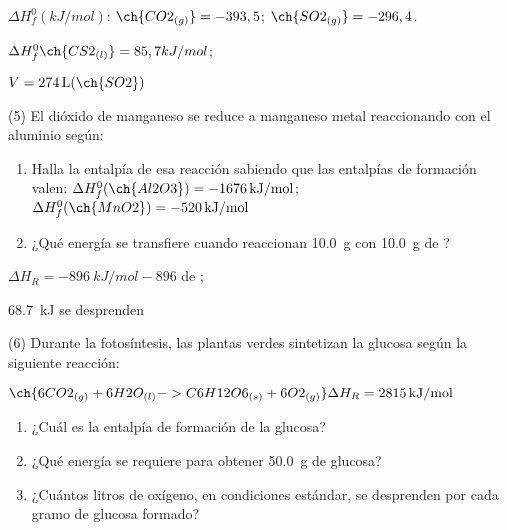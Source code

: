 \documentclass[10pt]{article}
\newenvironment{gexdatos}{
    \noindent\makebox[0pt][r]{\textit{Datos:}}
}{\vspace{5pt}}
\begin{document}
\begin{multicols}{2}
\begin{exercise}
  \begin{gexdatos}
    \( \Delta H^0_f (\si{kJ/mol}) \): \( \ch{CO2_{(g)}} = -393,5 \); \( \ch{SO2_{(g)}} = -296,4 \).
  \end{gexdatos}

\end{exercise}

\begin{solution}
  \begin{enumerate*}
    \item \( \Delta H^0_f \ch{CS2_{(l)}} = 85,7 kJ/mol \); \item \( V = \SI{274}{\liter} (\ch{SO2}) \)
  \end{enumerate*}
\end{solution}


\begin{exercise}
  (5) El dióxido de manganeso se reduce a manganeso metal reaccionando
  con el aluminio según:


  \begin{enumerate}
    \item Halla la entalpía de esa reacción sabiendo que las entalpías
    de formación valen:
    \( \Delta H^0_f (\ch{Al2O3}) = \SI{-1676}{kJ/mol} \); \( \Delta H^0_f (\ch{MnO2}) = \SI{-520}{kJ/mol} \)
    \item ¿Qué energía se transfiere cuando reaccionan \SI{10.0}{\gram}
     con \SI{10.0}{\gram} de ?
  \end{enumerate}
\end{exercise}

\begin{solution}
  \begin{enumerate*}
    \item \( \Delta H_R = \SI{-896}{kJ/mol}-896 \) de ;
    \item \SI{68.7}{kJ} se desprenden
  \end{enumerate*}
\end{solution}


\begin{exercise}
  (6) Durante la fotosíntesis, las plantas verdes sintetizan la glucosa
  según la siguiente reacción:

  \( \ch{6 CO2_{(g)} + 6 H2O_{(l)} -> C6H12O6_{(s)} + 6 O2_{(g)}} \Delta H_R = \SI{2815}{kJ/mol} \)

  \begin{enumerate}
    \item ¿Cuál es la entalpía de formación de la glucosa?
    \item ¿Qué energía se requiere para obtener \SI{50.0}{\gram} de glucosa?
    \item ¿Cuántos litros de oxígeno, en condiciones estándar, se desprenden por cada gramo de glucosa formado?
  \end{enumerate}


\end{exercise}
\end{multicols}
\end{document}
